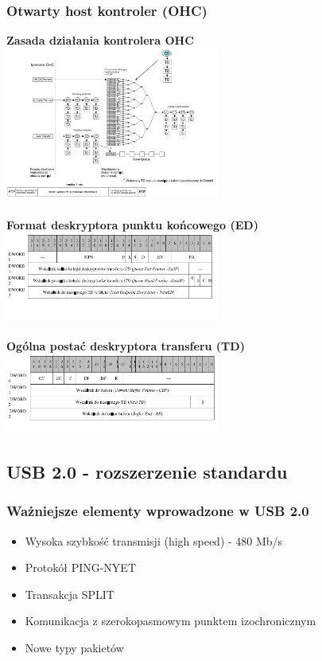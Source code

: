 	\subsubsection{Otwarty host kontroler (OHC)}
	\textbf{Zasada działania kontrolera OHC}\\
	\includegraphics[width=7cm]{./wyklady/USB_49_1.pdf}\\\\
	\textbf{Format deskryptora punktu końcowego (ED)}\\
	\includegraphics[width=7cm]{./wyklady/USB_50_1.pdf}\\\\
	\textbf{Ogólna postać deskryptora transferu (TD)}\\
	\includegraphics[width=7cm]{./wyklady/USB_51_1.pdf}
	
\subsection{USB 2.0 - rozszerzenie standardu}
	\subsubsection{Ważniejsze elementy wprowadzone w USB 2.0}
	\begin{itemize}
		\item Wysoka szybkość transmisji (high speed) - 480 Mb/s
		\item Protokół PING-NYET
		\item Transakcja SPLIT
		\item Komunikacja z szerokopasmowym punktem izochronicznym
		\item Nowe typy pakietów
	\end{itemize}
